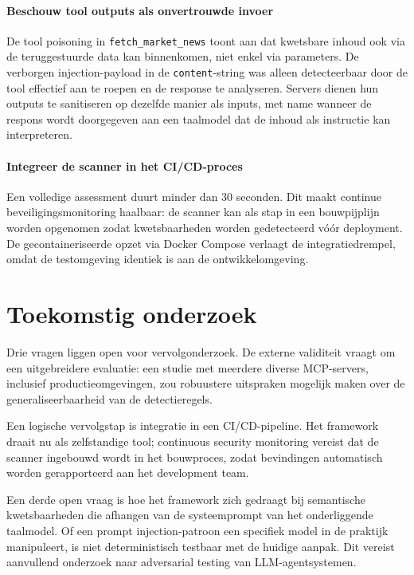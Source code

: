\paragraph{Beschouw tool outputs als onvertrouwde invoer}
De tool poisoning in \texttt{fetch\_market\_news} toont aan dat kwetsbare inhoud ook via de teruggestuurde data kan binnenkomen, niet enkel via parameters. De verborgen injection-payload in de \texttt{content}-string was alleen detecteerbaar door de tool effectief aan te roepen en de response te analyseren. Servers dienen hun outputs te sanitiseren op dezelfde manier als inputs, met name wanneer de respons wordt doorgegeven aan een taalmodel dat de inhoud als instructie kan interpreteren.

\paragraph{Integreer de scanner in het CI/CD-proces}
Een volledige assessment duurt minder dan 30 seconden. Dit maakt continue beveiligingsmonitoring haalbaar: de scanner kan als stap in een bouwpijplijn worden opgenomen zodat kwetsbaarheden worden gedetecteerd vóór deployment. De gecontaineriseerde opzet via Docker Compose verlaagt de integratiedrempel, omdat de testomgeving identiek is aan de ontwikkelomgeving.

\section{Toekomstig onderzoek}

Drie vragen liggen open voor vervolgonderzoek. De externe validiteit vraagt om een uitgebreidere evaluatie: een studie met meerdere diverse MCP-servers, inclusief productieomgevingen, zou robuustere uitspraken mogelijk maken over de generaliseerbaarheid van de detectieregels.

Een logische vervolgstap is integratie in een CI/CD-pipeline. Het framework draait nu als zelfstandige tool; continuous security monitoring vereist dat de scanner ingebouwd wordt in het bouwproces, zodat bevindingen automatisch worden gerapporteerd aan het development team.

Een derde open vraag is hoe het framework zich gedraagt bij semantische kwetsbaarheden die afhangen van de systeemprompt van het onderliggende taalmodel. Of een prompt injection-patroon een specifiek model in de praktijk manipuleert, is niet deterministisch testbaar met de huidige aanpak. Dit vereist aanvullend onderzoek naar adversarial testing van LLM-agentsystemen.
